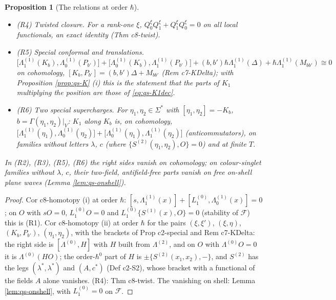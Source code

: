 \documentclass[11pt]{article}
\numberwithin{equation}{section}
\theoremstyle{plain}
\newtheorem{proposition}[theorem]{Proposition}
\theoremstyle{definition}
\begin{document}
\begin{proposition}[The relations at order $\hbar$]
\begin{itemize}
\[\begin{aligned}
\end{aligned}
\]
with $\chi'$ $s$-exact on families without letters $\lambda$, $c$; on the scalar bilinears $\hbar\Lambda^{(1)}_1(\Delta)O=D_1(O)$ is $0$ (traceless) and $-48u\,O$ (trace) at $\theta=-\tfrac13$ (Cor c9-ident), $R_1=0$ (Rem c7-internal), and $M_1(O)$ is the position part $(\omega x)^\mu P_1$ of the rotation component, $\cong0$ in the covariant scheme.
\item (R4) Twisted closure. For a rank-one $\xi$, $Q^\xi_0Q^\xi_1+Q^\xi_1Q^\xi_0=0$ on all local functionals, an exact identity (Thm c8-twist).
\item (R5) Special conformal and translations. $\big[\Lambda^{(1)}_1(K_b),\Lambda^{(1)}_0(P_{b'})\big]+\big[\Lambda^{(1)}_0(K_b),\Lambda^{(1)}_1(P_{b'})\big]+(b,b')\hbar\Lambda^{(1)}_1(\Delta)+\hbar\Lambda^{(1)}_1(M_{bb'})\cong0$ on cohomology, $[K_b,P_{b'}]=(b,b')\Delta+M_{bb'}$ (Rem c7-KDelta); with Proposition \ref{prop:qs-K} (i) this is the statement that the parts of $K_1$ multiplying the position are those of \eqref{eq:qs-K1dec}.
\item (R6) Two special supercharges. For $\eta_1,\eta_2\in\Sigma^*$ with $[\eta_1,\eta_2]=-K_{b}$, $b=\Gamma(\eta_1,\eta_2)|_V$: $K_1$ along $K_b$ is, on cohomology, $\big[\Lambda^{(1)}_1(\eta_1),\Lambda^{(1)}_0(\eta_2)\big]+\big[\Lambda^{(1)}_0(\eta_1),\Lambda^{(1)}_1(\eta_2)\big]$ (anticommutators), on families without letters $\lambda$, $c$ (where $\{S^{(2)}(\eta_1,\eta_2),O\}=0$) and at finite $T$.
\end{itemize}
In (R2), (R3), (R5), (R6) the right sides vanish on cohomology; on colour-singlet families without $\lambda$, $c$, their two-field, antifield-free parts vanish on free on-shell plane waves (Lemma \ref{lem:qs-onshell}).
\end{proposition}

\begin{proof}
Cor c8-homotopy (i) at order $\hbar$: $[s,\Lambda^{(1)}_1(x)]+[L_1^{(0)},\Lambda^{(1)}_0(x)]=0$; on $O$ with $sO=0$, $L_1^{(0)}O=0$ and $L_1^{(0)}\{S^{(1)}(x),O\}=0$ (stability of $\mathcal F$) this is (R1). Cor c8-homotopy (ii) at order $\hbar$ for the pairs $(\xi,\xi')$, $(\xi,\eta)$, $(K_b,P_{b'})$, $(\eta_1,\eta_2)$, with the brackets of Prop c2-special and Rem c7-KDelta: the right side is $[\Lambda^{(0)},H]$ with $H$ built from $\Lambda^{(2)}$, and on $O$ with $\Lambda^{(0)}O=0$ it is $\Lambda^{(0)}(HO)$; the order-$\hbar^0$ part of $H$ is $\pm\{S^{(2)}(x_1,x_2),-\}$, and $S^{(2)}$ has the legs $(\lambda^*,\lambda^*)$ and $(A,c^*)$ (Def c2-S2), whose bracket with a functional of the fields $A$ alone vanishes. (R4): Thm c8-twist. The vanishing on shell: Lemma \ref{lem:qs-onshell}, with $L_1^{(0)}=0$ on $\mathcal F$.
\end{proof}
\end{document}
